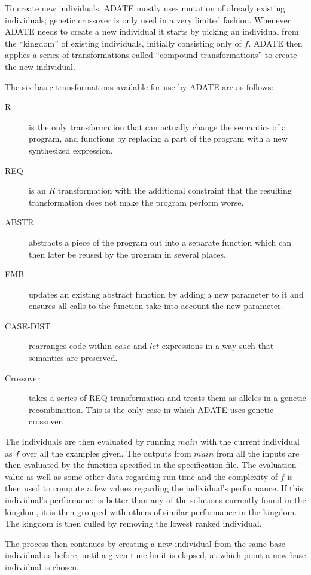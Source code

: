 To create new individuals, ADATE mostly uses mutation of already existing
individuals; genetic crossover is only used in a very limited fashion. Whenever
ADATE needs to create a new individual it starts by picking an individual from
the ``kingdom'' of existing individuals, initially consisting only of \(f\).
ADATE then applies a series of transformations called ``compound
transformations'' to create the new individual.

The six basic transformations available for use by ADATE are as follows:
\begin{description}
\item[R] is the only transformation that can actually change the semantics of a
  program, and functions by replacing a part of the program with a new
  synthesized expression.
\item[REQ] is an \(R\) transformation with the additional constraint that the
resulting transformation does not make the program perform worse.
\item[ABSTR] abstracts a piece of the program out into a separate function which
  can then later be reused by the program in several places.
\item[EMB] updates an existing abstract function by adding a new parameter to
it and ensures all calls to the function take into account the new parameter.
\item[CASE-DIST] rearranges code within \(case\) and \(let\) expressions in a
  way such that semantics are preserved.
\item[Crossover] takes a series of REQ transformation and treats them as alleles
  in a genetic recombination. This is the only case in which ADATE uses genetic
  crossover.
\end{description}

The individuals are then evaluated by running \(main\) with the current
individual as \(f\) over all the examples given. The outputs from \(main\) from
all the inputs are then evaluated by the function specified in the specification
file. The evaluation value as well as some other data regarding run time and the
complexity of \(f\) is then used to compute a few values regarding the
individual's performance. If this individual's performance is better than any of
the solutions currently found in the kingdom, it is then grouped with others of
similar performance in the kingdom. The kingdom is then culled by removing the
lowest ranked individual.

The process then continues by creating a new individual from the same base
individual as before, until a given time limit is elapsed, at which point a new
base individual is chosen.

